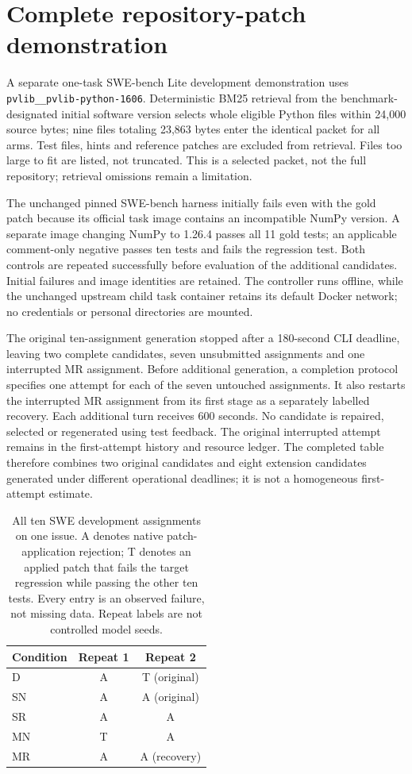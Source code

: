 \section{Complete repository-patch demonstration}
\label{sec:swe-dev1}

A separate one-task SWE-bench Lite development demonstration uses \texttt{pvlib\_\_pvlib-python-1606}. Deterministic BM25 retrieval from the benchmark-designated initial software version selects whole eligible Python files within 24,000 source bytes; nine files totaling 23,863 bytes enter the identical packet for all arms. Test files, hints and reference patches are excluded from retrieval. Files too large to fit are listed, not truncated. This is a selected packet, not the full repository; retrieval omissions remain a limitation.

The unchanged pinned SWE-bench harness initially fails even with the gold patch because its official task image contains an incompatible NumPy version. A separate image changing NumPy to 1.26.4 passes all 11 gold tests; an applicable comment-only negative passes ten tests and fails the regression test. Both controls are repeated successfully before evaluation of the additional candidates. Initial failures and image identities are retained. The controller runs offline, while the unchanged upstream child task container retains its default Docker network; no credentials or personal directories are mounted.

The original ten-assignment generation stopped after a 180-second CLI deadline, leaving two complete candidates, seven unsubmitted assignments and one interrupted MR assignment. Before additional generation, a completion protocol specifies one attempt for each of the seven untouched assignments. It also restarts the interrupted MR assignment from its first stage as a separately labelled recovery. Each additional turn receives 600 seconds. No candidate is repaired, selected or regenerated using test feedback. The original interrupted attempt remains in the first-attempt history and resource ledger. The completed table therefore combines two original candidates and eight extension candidates generated under different operational deadlines; it is not a homogeneous first-attempt estimate.

\begin{table}[t]
\centering
\caption{All ten SWE development assignments on one issue. A denotes native patch-application rejection; T denotes an applied patch that fails the target regression while passing the other ten tests. Every entry is an observed failure, not missing data. Repeat labels are not controlled model seeds.}
\label{tab:swe-complete}
\begin{tabular*}{\linewidth}{@{\extracolsep{\fill}}lcc}
\hline
Condition & Repeat 1 & Repeat 2 \\
\hline
D  & A & T (original) \\
SN & A & A (original) \\
SR & A & A \\
MN & T & A \\
MR & A & A (recovery) \\
\hline
\end{tabular*}
\end{table}

